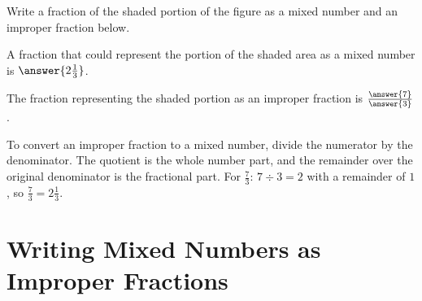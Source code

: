 \documentclass{ximera}
\begin{document}
\begin{problem}
 
Write a fraction of the shaded portion of the figure as a mixed number and an improper fraction below.
 
\begin{center}
\end{center}
 
A fraction that could represent the portion of the shaded area as a mixed number is $\answer{2\frac{1}{3}}$.
 
The fraction representing the shaded portion as an improper fraction is $\frac{\answer{7}}{\answer{3}}$.
\begin{feedback}
To convert an improper fraction to a mixed number, divide the numerator by the denominator. The quotient is the whole number part, and the remainder over the original denominator is the fractional part. For $\frac{7}{3}$: $7 \div 3 = 2$ with a remainder of $1$, so $\frac{7}{3} = 2\frac{1}{3}$.
\end{feedback}

\end{problem}


\section*{Writing Mixed Numbers as Improper Fractions}
\end{document}
